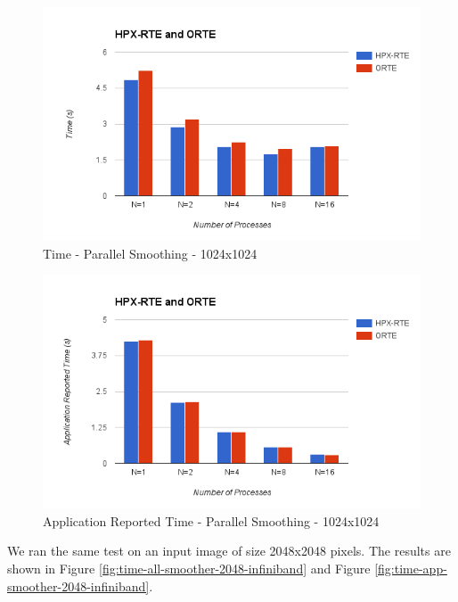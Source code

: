 \begin{figure}[h!]
  \centering
  \includegraphics[scale=0.7]{images/time-all-smoother-1024-infiniband.png}
  \caption[Time - Parallel Smoothing - 1024x1024]{Time - Parallel Smoothing - 1024x1024}
  \label{fig:time-all-smoother-1024-infiniband}
\end{figure}

\begin{figure}[h!]
  \centering
  \includegraphics[scale=0.7]{images/time-app-smoother-1024-infiniband.png}
  \caption[Application Reported Time - Parallel Smoothing - 1024x1024]{Application Reported Time - Parallel Smoothing - 1024x1024}
  \label{fig:time-app-smoother-1024-infiniband}
\end{figure}

We ran the same test on an input image of size 2048x2048 pixels. The results are shown in Figure \ref{fig:time-all-smoother-2048-infiniband} and Figure \ref{fig:time-app-smoother-2048-infiniband}.

